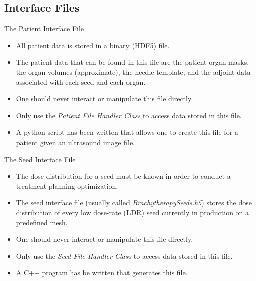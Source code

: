 \documentclass{beamer}
\begin{document}
\subsection{Interface Files}
\begin{frame}{The Patient Interface File}
  
  \begin{itemize}
    \item All patient data is stored in a binary (HDF5) file.
      \medskip
    \item The patient data that can be found in this file are the patient organ
      masks, the organ volumes (approximate), the needle template, and the
      adjoint data associated with each seed and each organ.
      \medskip
    \item One should never interact or manipulate this file directly.
      \medskip
    \item Only use the \textit{Patient File Handler Class} to access data
      stored in this file.
      \medskip
    \item A python script has been written that allows one to create this file
      for a patient given an ultrasound image file.
  \end{itemize}

\end{frame}

\begin{frame}{The Seed Interface File}

  \begin{itemize}
    \item The dose distribution for a seed must be known in order to conduct
      a treatment planning optimization.
      \medskip
    \item The seed interface file (usually called 
      \textit{BrachytherapySeeds.h5}) stores the dose distribution of every
      low dose-rate (LDR) seed currently in production on a predefined mesh.
      \medskip
    \item One should never interact or manipulate this file directly.
      \medskip
    \item Only use the \textit{Seed File Handler Class} to access data stored
      in this file.
      \medskip
    \item A C++ program has be written that generates this file.
  \end{itemize}
  
\end{frame}
\end{document}
